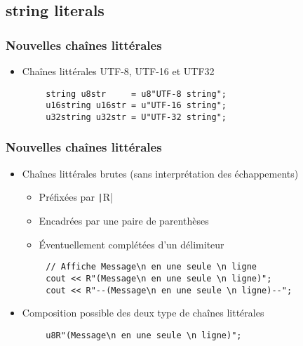 \documentclass[C++.tex]{subfiles}
\begin{document}
\subsection*{string literals}
\begin{frame}[fragile]
	\frametitle{Nouvelles chaînes littérales}
	\begin{itemize}
		\item Chaînes littérales UTF-8, UTF-16 et UTF32
	\end{itemize}

	\begin{verbatim}
		string u8str     = u8"UTF-8 string";
		u16string u16str = u"UTF-16 string";
		u32string u32str = U"UTF-32 string";
	\end{verbatim}
\end{frame}

\begin{frame}[fragile]
	\frametitle{Nouvelles chaînes littérales}
	\begin{itemize}
		\item Chaînes littérales brutes (sans interprétation des échappements)


		\begin{itemize}
			\item Préfixées par \texttt|R|
			\item Encadrées par une paire de parenthèses
			\item Éventuellement complétées d'un délimiteur
		\end{itemize}
	\end{itemize}

	\begin{verbatim}
		// Affiche Message\n en une seule \n ligne
		cout << R"(Message\n en une seule \n ligne)";
		cout << R"--(Message\n en une seule \n ligne)--";
	\end{verbatim}

	\begin{itemize}
		\item Composition possible des deux type de chaînes littérales
	\end{itemize}

	\begin{verbatim}
		u8R"(Message\n en une seule \n ligne)";
	\end{verbatim}


\end{frame}
\end{document}
